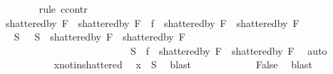 \begin{isabellebody}
\ \ \ \ \ \ \isamarkupfalse%
\ {\isacharparenleft}{\kern0pt}rule\ ccontr{\isacharparenright}{\kern0pt}\isanewline
\ \ \ \ \ \ \ \ \isamarkupfalse%
\ {\isachardoublequoteopen}{\isacharparenleft}{\kern0pt}shattered{\isacharunderscore}{\kern0pt}by\ {\isacharquery}{\kern0pt}F{}\ {\isasymunion}\ shattered{\isacharunderscore}{\kern0pt}by\ {\isacharquery}{\kern0pt}F{}{\isacharparenright}{\kern0pt}\ {\isasyminter}\ {\isacharquery}{\kern0pt}f\ {\isacharbackquote}{\kern0pt}\ {\isacharparenleft}{\kern0pt}shattered{\isacharunderscore}{\kern0pt}by\ {\isacharquery}{\kern0pt}F{}\ {\isasyminter}\ shattered{\isacharunderscore}{\kern0pt}by\ {\isacharquery}{\kern0pt}F{}{\isacharparenright}{\kern0pt}\ {\isasymnoteq}\ {\isacharbraceleft}{\kern0pt}{\isacharbraceright}{\kern0pt}{\isachardoublequoteclose}\isanewline
\ \ \ \ \ \ \ \ \isamarkupfalse%
\ \isamarkupfalse%
\ S\ \ {}{}{\isacharcolon}{\kern0pt}\ {\isachardoublequoteopen}S\ {\isasymin}\ {\isacharparenleft}{\kern0pt}shattered{\isacharunderscore}{\kern0pt}by\ {\isacharquery}{\kern0pt}F{}\ {\isasymunion}\ shattered{\isacharunderscore}{\kern0pt}by\ {\isacharquery}{\kern0pt}F{}{\isacharparenright}{\kern0pt}{\isachardoublequoteclose}\ \isanewline
\ \ \ \ \ \ \ \ \ \ \ \ \ \ \ \ \ \ \ \ \ \ \ \ \ {}{}{\isacharcolon}{\kern0pt}\ {\isachardoublequoteopen}S\ {\isasymin}\ {\isacharquery}{\kern0pt}f\ {\isacharbackquote}{\kern0pt}\ {\isacharparenleft}{\kern0pt}shattered{\isacharunderscore}{\kern0pt}by\ {\isacharquery}{\kern0pt}F{}\ {\isasyminter}\ shattered{\isacharunderscore}{\kern0pt}by\ {\isacharquery}{\kern0pt}F{}{\isacharparenright}{\kern0pt}{\isachardoublequoteclose}\ \isamarkupfalse%
\ auto\isanewline
\ \ \ \ \ \ \ \ \isamarkupfalse%
\ {}{}\ x{\isacharunderscore}{\kern0pt}not{\isacharunderscore}{\kern0pt}in{\isacharunderscore}{\kern0pt}shattered\ \isamarkupfalse%
\ {\isachardoublequoteopen}x\ {\isasymnotin}\ S{\isachardoublequoteclose}\ \isamarkupfalse%
\ blast\isanewline
\ \ \ \ \ \ \ \ \isamarkupfalse%
\ {}{}\ \isamarkupfalse%
\ {\isachardoublequoteopen}False{\isachardoublequoteclose}\ \isamarkupfalse%
\ blast\isanewline
\ \ \ \ \ \ \isamarkupfalse%
%
\begin{isamarkuptext}%

\end{isamarkuptext}
\end{isabellebody}
